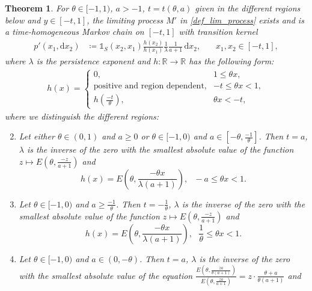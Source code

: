 \documentclass[12pt]{article}
\newcommand{\R}{\mathbb{R}} %
\newcommand{\E}{\mathbb{E}} %
\newcommand{\1}{\mathds{1}}
\renewcommand{\d}{\mathrm{d}}
\theoremstyle{definition}
\theoremstyle{plain}
\newtheorem{Theorem}[definition]{Theorem}
\theoremstyle{remark}
\begin{document}
\begin{Theorem}\label{maintheorem}
    For $\theta\in[-1,1)$, $a>-1$, $t=t(\theta,a)$ given in the different regions below and $y\in[-t,1]$, the limiting process $M'$ in \eqref{def_lim_process} exists and is a time-homogeneous Markov chain on $[-t,1]$ with transition kernel 
\begin{align*}
     p'(x_1,\d x_2)&\coloneqq\mathds{1}_S(x_2,x_1)\frac{h(x_2)}{h(x_1)}\frac{1}{\lambda}\frac{1}{a+1}\,\d x_2,~~~~~~~~x_1,x_2\in[-t,1],
\end{align*}
 where $\lambda$ is the persistence exponent and $h:\R\to\R$ has the following form:
 \begin{align*}
     h(x)=\begin{cases}
         0,~~~&1\le \theta x,
         \\\text{positive and region dependent},&-t\le\theta x<1,
         \\h\left(\frac{-t}{\theta}\right),~~&\theta x<-t,
     \end{cases}
 \end{align*}
 where we distinguish the different regions:
\begin{enumerate}[label={\rm (\Alph{*})},ref={\rm (\Alph{*})}]
    \setcounter{enumi}{1}
     \item  Let either $\theta\in(0,1)$ and $a\geq 0$ or $\theta\in[-1,0)$ and $a\in[-\theta,\frac{-1}{\theta}]$. Then $t=a$, $\lambda$ is the inverse of the zero with the smallest absolute value of the function $z\mapsto E\left(\theta,\frac{-z}{a+1}\right)$ and
        $$h(x)=E\left(\theta,\frac{-\theta x}{\lambda (a+1)}\right),~~~-a\leq\theta x<1.
            $$
\setcounter{enumi}{6}
     \item  Let $\theta\in[-1,0)$ and $a\geq \frac{-1}{\theta}$. Then $t=-\frac{1}{\theta}$, $\lambda$ is the inverse of the zero with the smallest absolute value of the function $z\mapsto E\left(\theta,\frac{-z}{a+1}\right)$ and
     $$h(x)= E\left(\theta,\frac{-\theta x}{\lambda (a+1)}\right),~~~\frac{1}{\theta }\leq \theta x< 1.$$
\setcounter{enumi}{24}
     \item Let $\theta\in[-1,0)$ and $a\in(0,-\theta)$. Then $t=a$, $\lambda$ is the inverse of the zero with the smallest absolute value of the equation $\frac{E\left(\theta,\frac{za}{\theta(a+1)}\right)}{E\left(\theta,\frac{za}{a+1}\right)}=z\cdot\frac{\theta +a}{\theta(a+1)}$ and

\end{enumerate}
\end{Theorem}
\end{document}
